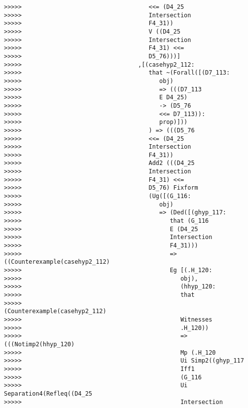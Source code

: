 \documentclass[12pt]{article}
\begin{document}
\begin{verbatim}
>>>>>                                    <<= (D4_25
>>>>>                                    Intersection
>>>>>                                    F4_31))
>>>>>                                    V ((D4_25
>>>>>                                    Intersection
>>>>>                                    F4_31) <<=
>>>>>                                    D5_76)))]
>>>>>                                 ,[(casehyp2_112:
>>>>>                                    that ~(Forall([(D7_113:
>>>>>                                       obj)
>>>>>                                       => (((D7_113
>>>>>                                       E D4_25)
>>>>>                                       -> (D5_76
>>>>>                                       <<= D7_113)):
>>>>>                                       prop)]))
>>>>>                                    ) => (((D5_76
>>>>>                                    <<= (D4_25
>>>>>                                    Intersection
>>>>>                                    F4_31))
>>>>>                                    Add2 (((D4_25
>>>>>                                    Intersection
>>>>>                                    F4_31) <<=
>>>>>                                    D5_76) Fixform
>>>>>                                    (Ug([(G_116:
>>>>>                                       obj)
>>>>>                                       => (Ded([(ghyp_117:
>>>>>                                          that (G_116
>>>>>                                          E (D4_25
>>>>>                                          Intersection
>>>>>                                          F4_31)))
>>>>>                                          => ((Counterexample(casehyp2_112)
>>>>>                                          Eg [(.H_120:
>>>>>                                             obj),
>>>>>                                             (hhyp_120:
>>>>>                                             that
>>>>>                                             (Counterexample(casehyp2_112)
>>>>>                                             Witnesses
>>>>>                                             .H_120))
>>>>>                                             => (((Notimp2(hhyp_120)
>>>>>                                             Mp (.H_120
>>>>>                                             Ui Simp2((ghyp_117
>>>>>                                             Iff1
>>>>>                                             (G_116
>>>>>                                             Ui Separation4(Refleq((D4_25
>>>>>                                             Intersection

\end{verbatim}
\end{document}
